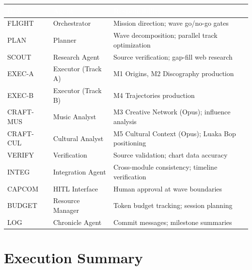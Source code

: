 \documentclass[11pt,letterpaper]{article}
\newcommand{\tableheader}[1]{\textbf{\sffamily\textcolor{white}{#1}}}
\begin{document}
\begin{center}
\begin{tabularx}{\textwidth}{L{2cm}L{3cm}X}
\toprule
{}
\tableheader{Role} & \tableheader{Agent} & \tableheader{Responsibility} \\
\midrule
FLIGHT & Orchestrator & Mission direction; wave go/no-go gates \\
PLAN & Planner & Wave decomposition; parallel track optimization \\
SCOUT & Research Agent & Source verification; gap-fill web research \\
EXEC-A & Executor (Track A) & M1 Origins, M2 Discography production \\
EXEC-B & Executor (Track B) & M4 Trajectories production \\
CRAFT-MUS & Music Analyst & M3 Creative Network (Opus); influence analysis \\
CRAFT-CUL & Cultural Analyst & M5 Cultural Context (Opus); Luaka Bop positioning \\
VERIFY & Verification & Source validation; chart data accuracy \\
INTEG & Integration Agent & Cross-module consistency; timeline verification \\
CAPCOM & HITL Interface & Human approval at wave boundaries \\
BUDGET & Resource Manager & Token budget tracking; session planning \\
LOG & Chronicle Agent & Commit messages; milestone summaries \\
\bottomrule
\end{tabularx}
\end{center}

\section{Execution Summary}
\end{document}

